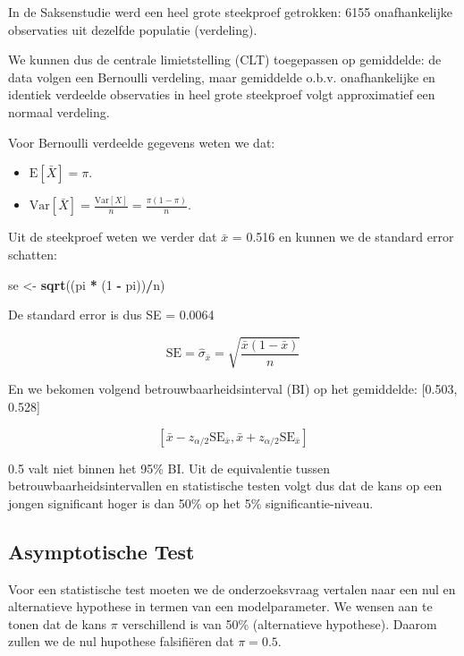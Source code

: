 \documentclass[
  12pt,dutch,coursenotes]{book}
\newenvironment{Shaded}{\begin{snugshade}}{\end{snugshade}}
\newcommand{\DecValTok}[1]{\textcolor[rgb]{0.00,0.00,0.81}{#1}}
\newcommand{\KeywordTok}[1]{\textcolor[rgb]{0.13,0.29,0.53}{\textbf{#1}}}
\newcommand{\NormalTok}[1]{#1}
\newcommand{\OperatorTok}[1]{\textcolor[rgb]{0.81,0.36,0.00}{\textbf{#1}}}
\newcommand{\StringTok}[1]{\textcolor[rgb]{0.31,0.60,0.02}{#1}}
\providecommand{\tightlist}{%
  \setlength{\itemsep}{0pt}\setlength{\parskip}{0pt}}
\theoremstyle{definition}
\theoremstyle{definition}
\theoremstyle{definition}
\theoremstyle{remark}
\begin{document}
In de Saksenstudie werd een heel grote steekproef getrokken: 6155 onafhankelijke observaties uit dezelfde populatie (verdeling).

We kunnen dus de centrale limietstelling (CLT) toegepassen op gemiddelde:
de data volgen een Bernoulli verdeling, maar gemiddelde o.b.v. onafhankelijke en identiek verdeelde observaties in heel grote steekproef volgt approximatief een normaal verdeling.

Voor Bernoulli verdeelde gegevens weten we dat:

\begin{itemize}
\tightlist
\item
  \(\text{E}[\bar X] = \pi\).
\item
  \(\text{Var}[\bar X] = \frac{\text{Var}[X]}{n} = \frac{\pi(1-\pi)}{n}\).
\end{itemize}

Uit de steekproef weten we verder dat \(\bar x\) = 0.516 en kunnen we de standard error schatten:

\begin{Shaded}
\begin{Highlighting}[]
\NormalTok{se \textless{}{-}}\StringTok{ }\KeywordTok{sqrt}\NormalTok{((pi }\OperatorTok{*}\StringTok{ }\NormalTok{(}\DecValTok{1} \OperatorTok{{-}}\StringTok{ }\NormalTok{pi))}\OperatorTok{/}\NormalTok{n)}
\end{Highlighting}
\end{Shaded}

De standard error is dus SE = 0.0064

\[
\text{SE} = \hat\sigma_{\bar x} = \sqrt{\frac{\bar x(1-\bar x)}{n}} \]

En we bekomen volgend betrouwbaarheidsinterval (BI) op het gemiddelde: {[}0.503, 0.528{]}

\[ [\bar x - z_{\alpha/2} \text{SE}_{\bar x}, \bar x + z_{\alpha/2} \text{SE}_{\bar x}]\]

0.5 valt niet binnen het 95\% BI. Uit de equivalentie tussen betrouwbaarheidsintervallen en statistische testen volgt dus dat de kans op een jongen significant hoger is dan 50\% op het 5\% significantie-niveau.

\hypertarget{asymptotische-test}{%
\subsection{Asymptotische Test}\label{asymptotische-test}}

Voor een statistische test moeten we de onderzoeksvraag vertalen naar een nul en alternatieve hypothese in termen van een modelparameter.
We wensen aan te tonen dat de kans \(\pi\) verschillend is van 50\% (alternatieve hypothese).
Daarom zullen we de nul hupothese falsifiëren dat \(\pi = 0.5\).
\end{document}
